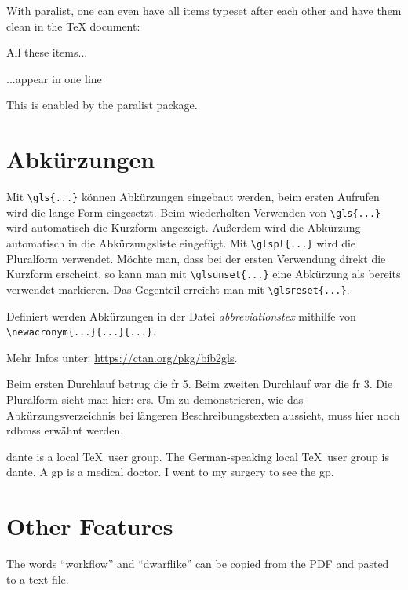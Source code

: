\documentclass[
  fontsize=10pt,
  numbers=noenddot,
  english,  %
  paper=a5,
  twoside,  %
  DIV=calc,
  headings=small,
  bibliography=totoc,
  listof=totoc,
  draft=false
]{scrbook}
\theoremstyle{break}
\begin{document}
With paralist, one can even have all items typeset after each other and have them clean in the TeX document:

\begin{ltgexample}
\begin{inparaenum}
  \item All these items...
  \item ...appear in one line
  \item This is enabled by the paralist package.
\end{inparaenum}
\end{ltgexample}

\section{Abkürzungen}

Mit \verb+\gls{...}+ können Abkürzungen eingebaut werden, beim ersten Aufrufen wird die lange Form eingesetzt.
Beim wiederholten Verwenden von \verb+\gls{...}+ wird automatisch die Kurzform angezeigt.
Außerdem wird die Abkürzung automatisch in die Abkürzungsliste eingefügt.
Mit \verb+\glspl{...}+ wird die Pluralform verwendet.
Möchte man, dass bei der ersten Verwendung direkt die Kurzform erscheint, so kann man mit \verb+\glsunset{...}+ eine Abkürzung als bereits verwendet markieren.
Das Gegenteil erreicht man mit \verb+\glsreset{...}+.

Definiert werden Abkürzungen in der Datei \textit{abbreviationstex} mithilfe von \verb+\newacronym{...}{...}{...}+.

Mehr Infos unter: \url{https://ctan.org/pkg/bib2gls}.

\begin{ltgexample}
Beim ersten Durchlauf betrug die \gls{fr} 5.
Beim zweiten Durchlauf war die \gls{fr} 3.
Die Pluralform sieht man hier: \glspl{er}.
Um zu demonstrieren, wie das Abkürzungsverzeichnis bei längeren Beschreibungstexten aussieht, muss hier noch \glspl{rdbms} erwähnt werden.

\gls{dante} is a local \TeX\ user group.
The German-speaking local \TeX\ user group is \gls{dante}.
A \gls{gp} is a medical doctor.
I went to my surgery to see the \gls{gp}.
\end{ltgexample}

\section{Other Features}

\begin{ltgexample}
The words \enquote{workflow} and \enquote{dwarflike} can be copied from the PDF and pasted to a text file.
\end{ltgexample}
\end{document}
